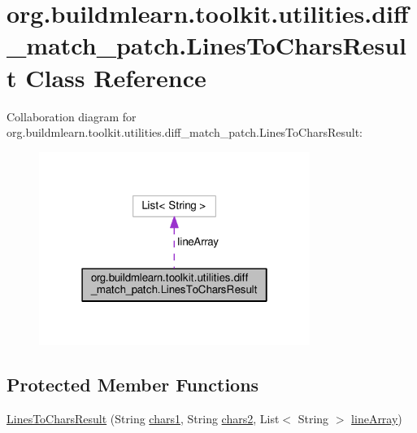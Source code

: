 \hypertarget{classorg_1_1buildmlearn_1_1toolkit_1_1utilities_1_1diff__match__patch_1_1LinesToCharsResult}{}\section{org.\+buildmlearn.\+toolkit.\+utilities.\+diff\+\_\+match\+\_\+patch.\+Lines\+To\+Chars\+Result Class Reference}
\label{classorg_1_1buildmlearn_1_1toolkit_1_1utilities_1_1diff__match__patch_1_1LinesToCharsResult}


Collaboration diagram for org.\+buildmlearn.\+toolkit.\+utilities.\+diff\+\_\+match\+\_\+patch.\+Lines\+To\+Chars\+Result\+:
\nopagebreak
\begin{figure}[H]
\begin{center}
\leavevmode
\includegraphics[width=250pt]{classorg_1_1buildmlearn_1_1toolkit_1_1utilities_1_1diff__match__patch_1_1LinesToCharsResult__coll__graph}
\end{center}
\end{figure}
\subsection*{Protected Member Functions}
\begin{DoxyCompactItemize}
\item 
\hyperlink{classorg_1_1buildmlearn_1_1toolkit_1_1utilities_1_1diff__match__patch_1_1LinesToCharsResult_aeda132778d3edd1186244c8358048c33}{Lines\+To\+Chars\+Result} (String \hyperlink{classorg_1_1buildmlearn_1_1toolkit_1_1utilities_1_1diff__match__patch_1_1LinesToCharsResult_a47581ab7cb34bdc7b35c15ee5279aa34}{chars1}, String \hyperlink{classorg_1_1buildmlearn_1_1toolkit_1_1utilities_1_1diff__match__patch_1_1LinesToCharsResult_ac31f129e1fd73832de11bcc65a49c322}{chars2}, List$<$ String $>$ \hyperlink{classorg_1_1buildmlearn_1_1toolkit_1_1utilities_1_1diff__match__patch_1_1LinesToCharsResult_aa2d7f5289bb2dfc874779ac2f48c0e82}{line\+Array})
\end{DoxyCompactItemize}

